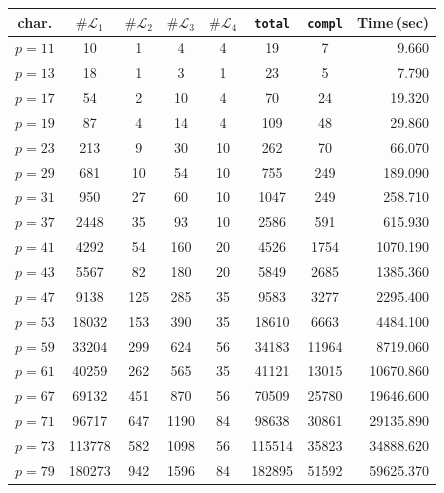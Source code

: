 \documentclass{amsart}
\theoremstyle{definition}
\theoremstyle{plain}
\begin{document}
\newpage
\begin{table}[htbp]
    \centering
    \begin{tabular}{c||c|c|c|c||c|c||r}
    char. & \hspace{2mm}$\#\mathcal{L}_1$\hspace{2mm} & \hspace{2mm}$\#\mathcal{L}_2$\hspace{2mm} & \hspace{2mm}$\#\mathcal{L}_3$\hspace{2mm} & \hspace{2mm}$\#\mathcal{L}_4$\hspace{2mm} & {\tt total} & {\tt compl} & Time\,(sec)\\\hline
    $p=11$ & 10 & 1 & 4 & 4 & 19 & 7 & 9.660\\\hline
    $p=13$ & 18 & 1 & 3 & 1 & 23 & 5 & 7.790\\\hline
    $p=17$ & 54 & 2 & 10 & 4 & 70 & 24 & 19.320\\\hline
    $p=19$ & 87 & 4 & 14 & 4 & 109 & 48 & 29.860\\\hline
    $p=23$ & 213 & 9 & 30 & 10 & 262 & 70 & 66.070\\\hline
    $p=29$ & 681 & 10 & 54 & 10 & 755 & 249 & 189.090\\\hline
    $p=31$ & 950 & 27 & 60 & 10 & 1047 & 249 & 258.710\\\hline
    $p=37$ & 2448 & 35 & 93 & 10 & 2586 & 591 & 615.930\\\hline
    $p=41$ & 4292 & 54 & 160 & 20 & 4526 & 1754 & 1070.190\\\hline
    $p=43$ & 5567 & 82 & 180 & 20 & 5849 & 2685 & 1385.360\\\hline
    $p=47$ & 9138 & 125 & 285 & 35 & 9583 & 3277 & 2295.400\\\hline
    $p=53$ & 18032 & 153 & 390 & 35 & 18610 & 6663 & 4484.100\\\hline
    $p=59$ & 33204 & 299 & 624 & 56 & 34183 & 11964 & 8719.060\\\hline
    $p=61$ & 40259 & 262 & 565 & 35 & 41121 & 13015 & 10670.860\\\hline
    $p=67$ & 69132 & 451 & 870 & 56 & 70509 & 25780 & 19646.600\\\hline
    $p=71$ & 96717 & 647 & 1190 & 84 & 98638 & 30861 & 29135.890\\\hline
    $p=73$ & 113778 & 582 & 1098 & 56 & 115514 & 35823 & 34888.620\\\hline
    $p=79$ & 180273 & 942 & 1596 & 84 & 182895 & 51592 & 59625.370 \\\hline

\end{tabular}
\end{table}
\end{document}
